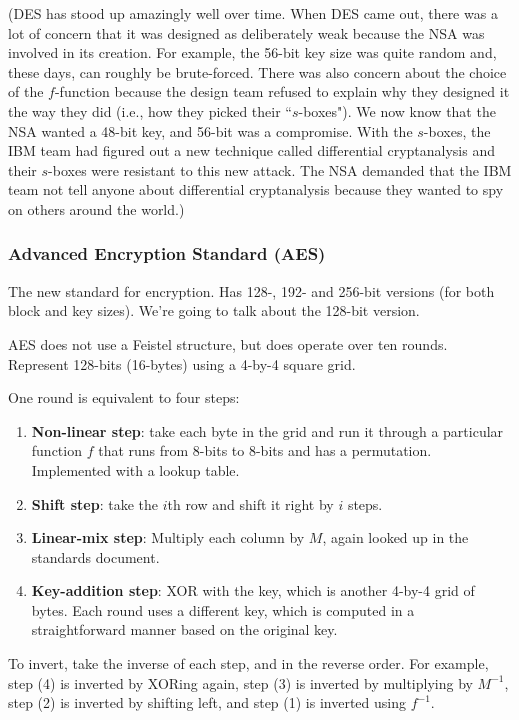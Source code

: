 \documentclass[12pt]{article}
\begin{document}
(DES has stood up amazingly well over time. When DES came out, there was a lot of concern that it was designed as deliberately weak because the NSA was involved in its creation. For example, the 56-bit key size was quite random and, these days, can roughly be brute-forced. There was also concern about the choice of the $f$-function because the design team refused to explain why they designed it the way they did (i.e., how they picked their ``$s$-boxes"). We now know that the NSA wanted a 48-bit key, and 56-bit was a compromise. With the $s$-boxes, the IBM team had figured out a new technique called differential cryptanalysis and their $s$-boxes were resistant to this new attack. The NSA demanded that the IBM team not tell anyone about differential cryptanalysis because they wanted to spy on others around the world.)

\subsubsection*{Advanced Encryption Standard (AES)}

The new standard for encryption. Has 128-, 192- and 256-bit versions (for both block and key sizes). We're going to talk about the 128-bit version.

AES does not use a Feistel structure, but does operate over ten rounds. Represent 128-bits (16-bytes) using a 4-by-4 square grid.

One round is equivalent to four steps:
\begin{enumerate}
\item \textbf{Non-linear step}: take each byte in the grid and run it through a particular function $f$ that runs from 8-bits to 8-bits and has a permutation. Implemented with a lookup table.
\item \textbf{Shift step}: take the $i$th row and shift it right by $i$ steps.
\item \textbf{Linear-mix step}: Multiply each column by $M$, again looked up in the standards document.
\item \textbf{Key-addition step}: XOR with the key, which is another 4-by-4 grid of bytes. Each round uses a different key, which is computed in a straightforward manner based on the original key.
\end{enumerate}

To invert, take the inverse of each step, and in the reverse order. For example, step (4) is inverted by XORing again, step (3) is inverted by multiplying by $M^{-1}$, step (2) is inverted by shifting left, and step (1) is inverted using $f^{-1}$.
\end{document}
